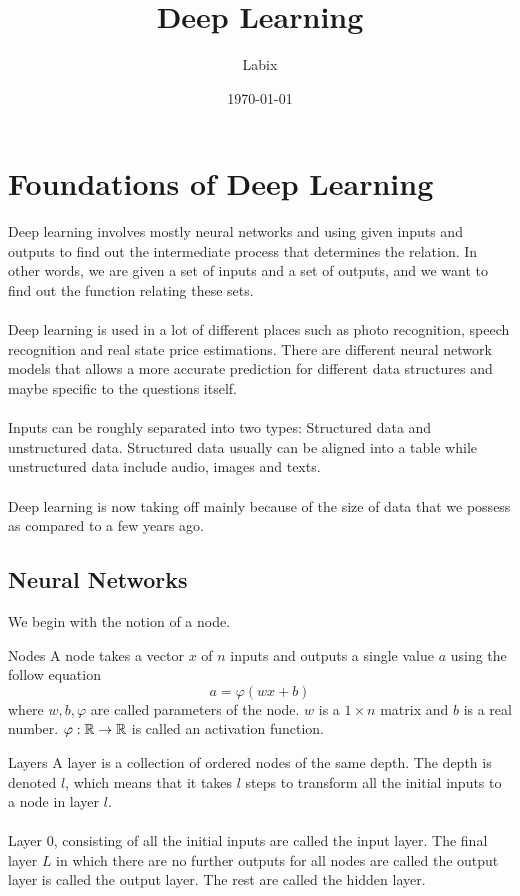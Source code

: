 \documentclass[a4paper]{article}
\title{Deep Learning}
\author{Labix}
\date{\today}
\begin{document}
\maketitle
\begin{abstract}
\end{abstract}
\tableofcontents
\pagebreak

\section{Foundations of Deep Learning}
Deep learning involves mostly neural networks and using given inputs and outputs to find out the intermediate process that determines the relation. In other words, we are given a set of inputs and a set of outputs, and we want to find out the function relating these sets. \\~\\
Deep learning is used in a lot of different places such as photo recognition, speech recognition and real state price estimations. There are different neural network models that allows a more accurate prediction for different data structures and maybe specific to the questions itself. \\~\\
Inputs can be roughly separated into two types: Structured data and unstructured data. Structured data usually can be aligned into a table while unstructured data include audio, images and texts. \\~\\
Deep learning is now taking off mainly because of the size of data that we possess as compared to a few years ago. 

\subsection{Neural Networks}
We begin with the notion of a node. 
\begin{defn}{Nodes}{} A node takes a vector $x$ of $n$ inputs and outputs a single value $a$ using the follow equation $$a=\varphi(wx+b)$$ where $w,b,\varphi$ are called parameters of the node. $w$ is a $1\times n$ matrix and $b$ is a real number. $\varphi:\mathbb{R}\to\mathbb{R}$ is called an activation function. 
\end{defn}

\begin{defn}{Layers}{} A layer is a collection of ordered nodes of the same depth. The depth is denoted $l$, which means that it takes $l$ steps to transform all the initial inputs to a node in layer $l$. \\~\\
Layer $0$, consisting of all the initial inputs are called the input layer. The final layer $L$ in which there are no further outputs for all nodes are called the output layer is called the output layer. The rest are called the hidden layer. 
\end{defn}
\end{document}

